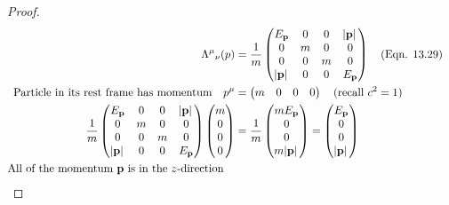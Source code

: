 \documentclass[letterpaper]{article}
\theoremstyle{definition}
\begin{document}
\begin{proof}
  \begin{align*}
    { \Lambda^\mu}_\nu(p)                                           & =\frac{1}{m}\begin{pmatrix}
      E_{\vb{p}}    & 0 & 0 & \abs*{\vb{p}} \\
      0             & m & 0 & 0             \\
      0             & 0 & m & 0             \\
      \abs*{\vb{p}} & 0 & 0 & E_{\vb{p}}    \\
    \end{pmatrix}\qq{(Eqn. 13.29)}              \\
    \qq*{Particle in its rest frame has momentum}p^\mu              & =\begin{pmatrix}
      m & 0 & 0 & 0 \\
    \end{pmatrix}\qq{(recall $c^2=1$)}                     \\
    \frac{1}{m}\begin{pmatrix}
      E_{\vb{p}}    & 0 & 0 & \abs*{\vb{p}} \\
      0             & m & 0 & 0             \\
      0             & 0 & m & 0             \\
      \abs*{\vb{p}} & 0 & 0 & E_{\vb{p}}    \\
    \end{pmatrix}\begin{pmatrix}
      m \\ 0 \\ 0 \\ 0 \\
    \end{pmatrix} & =\frac{1}{m}\begin{pmatrix}
      mE_{\vb{p}} \\ 0 \\ 0 \\ m\abs*{\vb{p}} \\
    \end{pmatrix}   =\begin{pmatrix}
      E_{\vb{p}} \\ 0 \\ 0 \\ \abs*{\vb{p}} \\
    \end{pmatrix} \\
    \qq*{All of the momentum $\vb{p}$ is in the $z$-direction}                                                                             \\
  \end{align*}
\end{proof}
\end{document}
